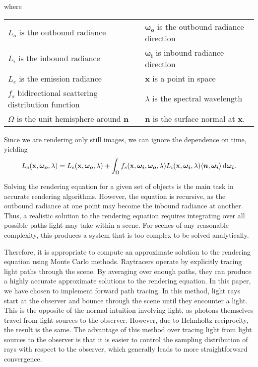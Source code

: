 \documentclass[12pt]{article}
\DeclarePairedDelimiter\ip{\langle }{\rangle}
\begin{document}
where
\begin{center}
  \begin{tabu}{ll}
    \(L_{o}\) is the outbound radiance & \(\bm{\omega_o}\) is the outbound radiance direction\\
    \(L_{i}\) is the inbound radiance & \(\bm{\omega_i}\) is inbound radiance direction\\
    \(L_{e}\) is the emission radiance & \(\mathbf x\) is a point in space\\
    \(f_s\) bidirectional scattering distribution function & \(\lambda\) is the spectral wavelength\\
    \(\Omega\) is the unit hemisphere around \(\bm n\) & \(\bm n\) is the surface normal at \(\mathbf x\).
  \end{tabu}
\end{center}
Since we are rendering only still images, we can ignore the dependence on time, yielding
\[L_{o}(\mathbf x, \bm {\omega_{o}}, \lambda) = L_{e}(\mathbf x, \bm{\omega_o}, \lambda) + \int_\Omega f_s(\mathbf x, \bm{\omega_i}, \bm{\omega_o}, \lambda)L_i(\mathbf x, \bm{\omega_i}, \lambda)\ip{\bm n, \bm{\omega_i}} \dif \bm{\omega_i}.\]

Solving the rendering equation for a given set of objects is the main task in accurate rendering algorithms.
However, the equation is recursive, as the outbound radiance at one point may become the inbound radiance at another.
Thus, a realistic solution to the rendering equation requires integrating over all possible paths light may take within a scene.
For scenes of any reasonable complexity, this produces a system that is too complex to be solved analytically.

Therefore, it is appropriate to compute an approximate solution to the rendering equation using Monte Carlo methods.
Raytracers operate by explicitly tracing light paths through the scene.
By averaging over enough paths, they can produce a highly accurate approximate solutions to the rendering equation.
In this paper, we have chosen to implement forward path tracing.
In this method, light rays start at the observer and bounce through the scene until they encounter a light.
This is the opposite of the normal intuition involving light, as photons themselves travel from light sources to the observer.
However, due to Helmholtz reciprocity, the result is the same.
The advantage of this method over tracing light from light sources to the observer is that it is easier to control the sampling distribution of rays with respect to the observer, which generally leads to more straightforward convergence.
\end{document}
